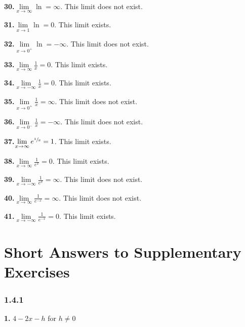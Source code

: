 \documentclass[12pt,]{book}
\theoremstyle{plain}
\theoremstyle{definition}
\numberwithin{equation}{section}
\newcommand{\fe}[2]{\mathop{{#1}{\left(#2\right)}}}
\begin{document}
\par\smallskip
\noindent\textbf{30.}\quad{}\(\lim\limits_{x\to\infty}\fe{\ln}{x}=\infty\). This limit does not exist.%
\par\smallskip
\noindent\textbf{31.}\quad{}\(\lim\limits_{x\to1}\fe{\ln}{x}=0\). This limit exists.%
\par\smallskip
\noindent\textbf{32.}\quad{}\(\lim\limits_{x\to0^{+}}\fe{\ln}{x}=-\infty\). This limit does not exist.%
\par\smallskip
\noindent\textbf{33.}\quad{}\(\lim\limits_{x\to\infty}\frac{1}{x}=0\). This limit exists.%
\par\smallskip
\noindent\textbf{34.}\quad{}\(\lim\limits_{x\to-\infty}\frac{1}{x}=0\). This limit exists.%
\par\smallskip
\noindent\textbf{35.}\quad{}\(\lim\limits_{x\to0^{+}}\frac{1}{x}=\infty\). This limit does not exist.%
\par\smallskip
\noindent\textbf{36.}\quad{}\(\lim\limits_{x\to0^{-}}\frac{1}{x}=-\infty\). This limit does not exist.%
\par\smallskip
\noindent\textbf{37.}\quad{}\(\lim\limits_{x\to\infty}e^{\sfrac{1}{x}}=1\). This limit exists.%
\par\smallskip
\noindent\textbf{38.}\quad{}\(\lim\limits_{x\to\infty}\frac{1}{e^x}=0\). This limit exists.%
\par\smallskip
\noindent\textbf{39.}\quad{}\(\lim\limits_{x\to-\infty}\frac{1}{e^x}=\infty\). This limit does not exist.%
\par\smallskip
\noindent\textbf{40.}\quad{}\(\lim\limits_{x\to\infty}\frac{1}{e^{-x}}=\infty\). This limit does not exist.%
\par\smallskip
\noindent\textbf{41.}\quad{}\(\lim\limits_{x\to-\infty}\frac{1}{e^{-x}}=0\). This limit exists.%
\par\smallskip
\typeout{************************************************}
\typeout{************************************************}
\chapter[Short Answers to Supplementary Exercises]{Short Answers to Supplementary Exercises}\label{appendix-2}
\subsection*{1.4.1 }
\noindent\textbf{1.}\quad{}
                    \(4-2x-h\) for \(h\neq0\)%
\end{document}
